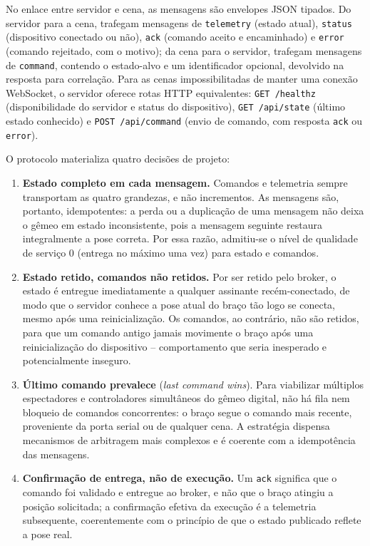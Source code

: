 \documentclass[12pt]{article}
\begin{document}
No enlace entre servidor e cena, as mensagens são envelopes JSON tipados. Do servidor para a cena, trafegam mensagens de \texttt{telemetry} (estado atual), \texttt{status} (dispositivo conectado ou não), \texttt{ack} (comando aceito e encaminhado) e \texttt{error} (comando rejeitado, com o motivo); da cena para o servidor, trafegam mensagens de \texttt{command}, contendo o estado-alvo e um identificador opcional, devolvido na resposta para correlação. Para as cenas impossibilitadas de manter uma conexão WebSocket, o servidor oferece rotas HTTP equivalentes: \texttt{GET /healthz} (disponibilidade do servidor e status do dispositivo), \texttt{GET /api/state} (último estado conhecido) e \texttt{POST /api/command} (envio de comando, com resposta \texttt{ack} ou \texttt{error}).

O protocolo materializa quatro decisões de projeto:

\begin{enumerate}
    \item \textbf{Estado completo em cada mensagem.} Comandos e telemetria sempre transportam as quatro grandezas, e não incrementos. As mensagens são, portanto, idempotentes: a perda ou a duplicação de uma mensagem não deixa o gêmeo em estado inconsistente, pois a mensagem seguinte restaura integralmente a pose correta. Por essa razão, admitiu-se o nível de qualidade de serviço 0 (entrega no máximo uma vez) para estado e comandos.
    \item \textbf{Estado retido, comandos não retidos.} Por ser retido pelo broker, o estado é entregue imediatamente a qualquer assinante recém-conectado, de modo que o servidor conhece a pose atual do braço tão logo se conecta, mesmo após uma reinicialização. Os comandos, ao contrário, não são retidos, para que um comando antigo jamais movimente o braço após uma reinicialização do dispositivo -- comportamento que seria inesperado e potencialmente inseguro.
    \item \textbf{Último comando prevalece} (\textit{last command wins}). Para viabilizar múltiplos espectadores e controladores simultâneos do gêmeo digital, não há fila nem bloqueio de comandos concorrentes: o braço segue o comando mais recente, proveniente da porta serial ou de qualquer cena. A estratégia dispensa mecanismos de arbitragem mais complexos e é coerente com a idempotência das mensagens.
    \item \textbf{Confirmação de entrega, não de execução.} Um \texttt{ack} significa que o comando foi validado e entregue ao broker, e não que o braço atingiu a posição solicitada; a confirmação efetiva da execução é a telemetria subsequente, coerentemente com o princípio de que o estado publicado reflete a pose real.
\end{enumerate}
\end{document}
